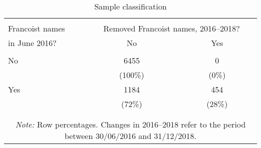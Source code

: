\begin{table}[!htbp] \centering
\caption{Sample classification}
\label{tab:sample_trt}
\small
\begin{tabular}{lcc}
\\[-1.8ex]\hline
\hline \\[-1.8ex]
\multicolumn{1}{p{3cm}}{\hspace{3cm} Francoist names} & \multicolumn{2}{p{3.5cm}}{Removed Francoist names, 2016--2018?}\\
in June 2016? & No & Yes \\
\cline{2-3} \\[-1.8ex]
No & 6455 & 0 \\
 & (100\%) & (0\%) \\
Yes \hspace{3cm} & 1184 & 454 \\
 & (72\%) & (28\%) \\
\\[-1.8ex]\hline
\hline \\[-1.8ex]
\multicolumn{3}{c}{\parbox[t]{0.55\textwidth}{\textit{Note:} Row percentages. Changes in 2016--2018 refer to the period between 30/06/2016 and 31/12/2018.}}\\
\end{tabular}
\end{table}
